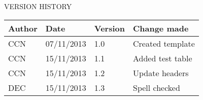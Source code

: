 \documentclass{article}
\begin{document}
	\vspace{1cm}
	\begin{section}{VERSION HISTORY}
		\begin{tabularx}{\linewidth}{| p{2cm} | p{2cm} | p{2cm} | X | }
			\hline
			\bf{Author} & \bf{Date} & \bf{Version} & \bf{Change made} \\
			\hline
			CCN & 07/11/2013 & 1.0 & Created template \\
			\hline
			CCN & 15/11/2013 & 1.1 & Added test table \\
			\hline
			CCN & 15/11/2013 & 1.2 & Update headers \\
			\hline
			DEC & 15/11/2013 & 1.3 & Spell checked \\
			\hline
		\end{tabularx}
	\end{section}
\end{document}
